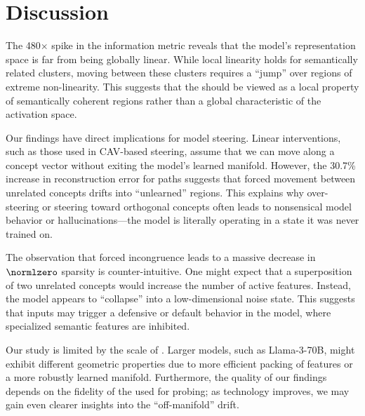 \section{Discussion}

 The 480$\times$ spike in the information metric reveals that the model's representation space is far from being globally linear. While local linearity holds for semantically related clusters, moving between these clusters requires a ``jump'' over regions of extreme non-linearity. This suggests that the \lrh should be viewed as a local property of semantically coherent regions rather than a global characteristic of the activation space.

 Our findings have direct implications for model steering. Linear interventions, such as those used in CAV-based steering, assume that we can move along a concept vector without exiting the model's learned manifold. However, the 30.7\% increase in \sae reconstruction error for \incongruent paths suggests that forced movement between unrelated concepts drifts into ``unlearned'' regions. This explains why over-steering or steering toward orthogonal concepts often leads to nonsensical model behavior or hallucinations—the model is literally operating in a state it was never trained on.

 The observation that forced incongruence leads to a massive decrease in $\normlzero$ sparsity is counter-intuitive. One might expect that a superposition of two unrelated concepts would increase the number of active features. Instead, the model appears to ``collapse'' into a low-dimensional noise state. This suggests that \incongruent inputs may trigger a defensive or default behavior in the model, where specialized semantic features are inhibited.

 Our study is limited by the scale of \gpttwo. Larger models, such as Llama-3-70B, might exhibit different geometric properties due to more efficient packing of features or a more robustly learned manifold. Furthermore, the quality of our findings depends on the fidelity of the \saes used for probing; as \sae technology improves, we may gain even clearer insights into the ``off-manifold'' drift.
